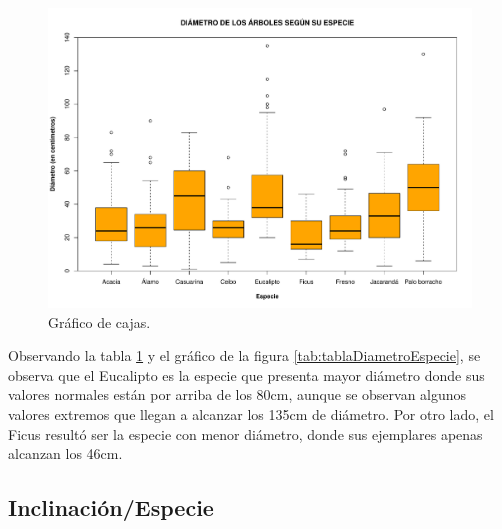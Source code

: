 \documentclass[11pt]{article}
\begin{document}
\begin{figure}[h!]
  \begin{center}
    \includegraphics[width=0.9\linewidth]{boxDiametroEspecie.pdf}
    \caption{Gráfico de cajas.}
    \label{fig:boxDiametroEspecie}
  \end{center}  
\end{figure}

\begin{justify}
  Observando la tabla \ref{fig:boxDiametroEspecie} y el gráfico
  de la figura \ref{tab:tablaDiametroEspecie}, se observa que el Eucalipto es la
  especie que presenta mayor diámetro donde sus valores normales están
  por arriba de los 80cm, aunque se observan algunos valores extremos que llegan
  a alcanzar los 135cm de diámetro. Por otro lado, el Ficus resultó ser la
  especie con menor diámetro, donde sus ejemplares apenas alcanzan los 46cm.
\end{justify}


\newpage
\subsection{Inclinación/Especie}
\end{document}

